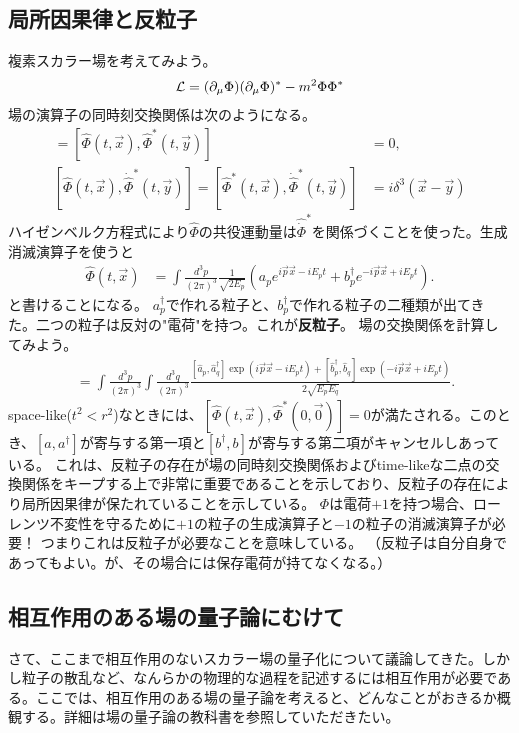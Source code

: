 \documentclass[10pt,a4paper]{jarticle}
\begin{document}
\subsection{局所因果律と反粒子}
複素スカラー場を考えてみよう。
\begin{align}
{\cal L} = (\partial_\mu \Phi) (\partial_\mu \Phi)^* - m^2 \Phi \Phi^*
\end{align}
場の演算子の同時刻交換関係は次のようになる。
\begin{align}
[\hat\Phi(t,\vec x), \hat\Phi(t,\vec y)] = [\hat\Phi(t,\vec x), \hat\Phi^*(t,\vec y)] &= 0, \\
[\hat\Phi(t,\vec x), \dot{\hat\Phi}^*(t,\vec y)] = [\hat\Phi^*(t,\vec x), \dot{\hat\Phi}^*(t,\vec y)] &= i\delta^3(\vec x - \vec y)
\end{align}
ハイゼンベルク方程式により$\hat\Phi$の共役運動量は$\hat{\dot\Phi}^*$を関係づくことを使った。生成消滅演算子を使うと
\begin{align}
\hat\Phi(t,\vec x) &= \int \frac{d^3 p}{(2\pi)^3} \frac{1}{\sqrt{2E_p}} \left( a_p e^{i\vec p \vec x - i E_p t} + b_p^\dagger e^{-i\vec p \vec x + i E_p t} \right).
\end{align}
と書けることになる。
$a_p^\dagger$で作れる粒子と、$b_p^\dagger$で作れる粒子の二種類が出てきた。二つの粒子は反対の"電荷"を持つ。これが\textbf{反粒子}。
場の交換関係を計算してみよう。
\begin{align}
[\hat\Phi(t,\vec x), \hat\Phi^*(0,\vec 0)]
&=
\int \frac{d^3 p}{(2\pi)^3}
\int \frac{d^3 q}{(2\pi)^3}
\frac{ [\hat a_p, \hat a_q^\dagger] \exp\left( i\vec p \vec x - i E_p t  \right)
+ [\hat b_p^\dagger, \hat b_q] \exp\left( -i\vec p \vec x + i E_p t  \right)
}{2\sqrt{E_pE_q}}.
\end{align}
space-like($t^2 < r^2$)なときには、$[\hat\Phi(t,\vec x), \hat\Phi^*(0,\vec 0)] = 0$が満たされる。このとき、$[a,a^\dagger]$が寄与する第一項と$[b^\dagger,b]$が寄与する第二項がキャンセルしあっている。
これは、反粒子の存在が場の同時刻交換関係およびtime-likeな二点の交換関係をキープする上で非常に重要であることを示しており、反粒子の存在により局所因果律が保たれていることを示している。
$\Phi$は電荷$+1$を持つ場合、ローレンツ不変性を守るために$+1$の粒子の生成演算子と$-1$の粒子の消滅演算子が必要！
つまりこれは反粒子が必要なことを意味している。
（反粒子は自分自身であってもよい。が、その場合には保存電荷が持てなくなる。）


\subsection{相互作用のある場の量子論にむけて}
さて、ここまで相互作用のないスカラー場の量子化について議論してきた。しかし粒子の散乱など、なんらかの物理的な過程を記述するには相互作用が必要である。ここでは、相互作用のある場の量子論を考えると、どんなことがおきるか概観する。詳細は場の量子論の教科書を参照していただきたい。
\end{document}
